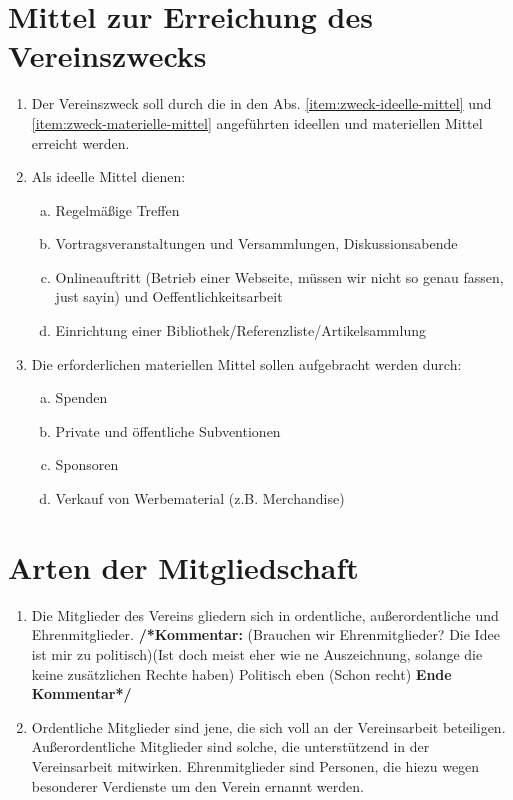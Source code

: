\documentclass[a4paper,12pt]{article}
\newcommand{\comment}[1]{{\newline \bf /*Kommentar:} #1 {\bf Ende Kommentar*/}}
\begin{document}
\section{Mittel zur Erreichung des Vereinszwecks}%
\label{sec:Mittel}
\begin{enumerate}
\item Der Vereinszweck soll durch die in den Abs. \ref{item:zweck-ideelle-mittel} und \ref{item:zweck-materielle-mittel} angeführten ideellen und materiellen Mittel erreicht werden.
\item\label{item:zweck-ideelle-mittel} Als ideelle Mittel dienen:
\begin{enumerate}[(a)]
\item Regelmäßige Treffen
\item Vortragsveranstaltungen und Versammlungen, Diskussionsabende
\item Onlineauftritt (Betrieb einer Webseite, müssen wir nicht so genau fassen, just sayin) und Oeffentlichkeitsarbeit
\item Einrichtung einer Bibliothek/Referenzliste/Artikelsammlung
\end{enumerate}
\item\label{item:zweck-materielle-mittel} Die erforderlichen materiellen Mittel sollen aufgebracht werden durch:
\begin{enumerate}[(a)]
\item Spenden
\item Private und öffentliche Subventionen
\item Sponsoren
\item Verkauf von Werbematerial (z.B. Merchandise)

%
%
%
%

\end{enumerate}
\end{enumerate}


\section{Arten der Mitgliedschaft} %
\label{sec:Mitgliedschaft-Arten}
\begin{enumerate}
\item Die Mitglieder des Vereins gliedern sich in ordentliche, außerordentliche und Ehrenmitglieder.
\comment{(Brauchen wir Ehrenmitglieder? Die Idee ist mir zu politisch)(Ist doch meist eher wie ne Auszeichnung, solange die keine zusätzlichen Rechte haben) Politisch eben (Schon recht)}
\item Ordentliche Mitglieder sind jene, die sich voll an der Vereinsarbeit beteiligen. Außerordentliche Mitglieder sind solche, die unterstützend in der Vereinsarbeit mitwirken. Ehrenmitglieder sind Personen, die hiezu wegen besonderer Verdienste um den Verein ernannt werden.
\end{enumerate}
\end{document}
